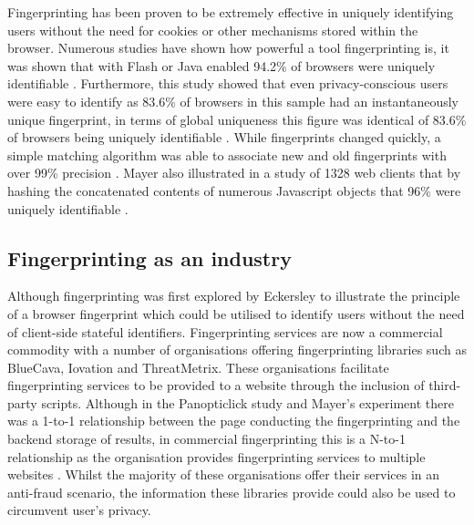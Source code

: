 \documentclass{article}
\begin{document}
Fingerprinting has been proven to be extremely effective in uniquely identifying users without the need for cookies or other mechanisms stored within the browser. Numerous studies have shown how powerful a tool fingerprinting is, it was shown that with Flash or Java enabled 94.2\% of browsers were uniquely identifiable \parencite{uniqueBrowser}. Furthermore, this study showed that even privacy-conscious users were easy to identify as 83.6\% of browsers in this sample had an instantaneously unique fingerprint, in terms of global uniqueness this figure was identical of 83.6\% of browsers being uniquely identifiable \parencite{uniqueBrowser}. While fingerprints changed quickly, a simple matching algorithm was able to associate new and old fingerprints with over 99\% precision \parencite{uniqueBrowser}. Mayer also illustrated in a study of 1328 web clients that by hashing the concatenated contents of numerous Javascript objects that 96\% were uniquely identifiable \parencite{mayer09}. \\ 

\subsection{Fingerprinting as an industry}
Although fingerprinting was first explored by Eckersley \parencite{uniqueBrowser} to illustrate the principle of a browser fingerprint which could be utilised to identify users without the need of client-side stateful identifiers. Fingerprinting services are now a commercial commodity with a number of organisations offering fingerprinting libraries such as BlueCava, Iovation and ThreatMetrix. These organisations facilitate fingerprinting services to be provided to a website through the inclusion of third-party scripts. Although in the Panopticlick study \parencite{uniqueBrowser} and Mayer's experiment \parencite{mayer09} there was a 1-to-1 relationship between the page conducting the fingerprinting and the backend storage of results, in commercial fingerprinting this is a N-to-1 relationship as the organisation provides fingerprinting services to multiple websites \parencite{cookielessMonster}. Whilst the majority of these organisations offer their services in an anti-fraud scenario, the information these libraries provide could also be used to circumvent user's privacy. \\

\end{document}
